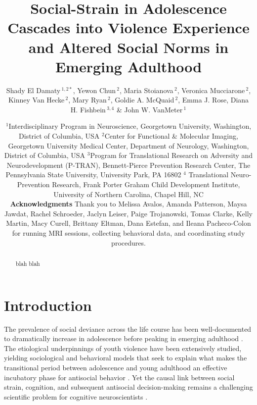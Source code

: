 \documentclass[utf8]{article}
\title{Social-Strain in Adolescence Cascades into Violence Experience and Altered Social Norms in Emerging Adulthood}
\author{
\parbox{\linewidth}{\centering
Shady El Damaty\,$^{1,2*}$, Yewon Chun\,$^{2}$, Maria Stoianova\,$^{2}$, Veronica Mucciarone\,$^{2}$,  Kinney Van Hecke\,$^{2}$, Mary Ryan\,$^{2}$, Goldie A. McQuaid\,$^{2}$, Emma J. Rose, Diana H. Fishbein\,$^{3,4}$ \& John W. VanMeter\,$^{1}$}
}
\date{\footnotesize{$^{1}$Interdisciplinary Program in Neuroscience, Georgetown University, Washington, District of Columbia, USA
$^{2}$Center for Functional \& Molecular Imaging, Georgetown University Medical Center, Department of Neurology, Washington, District of Columbia, USA
$^{3}$Program for Translational Research on Adversity and Neurodevelopment (P-TRAN), Bennett-Pierce Prevention Research Center, The Pennsylvania State University, University Park, PA 16802
$^{4}$ Translational Neuro-Prevention Research, Frank Porter Graham Child Development Institute, University of Northern Carolina, Chapel Hill, NC} \\  \vspace{5pt} \textbf{Acknowledgments}
Thank you to Melissa Avalos, Amanda Patterson, Maysa Jawdat, Rachel Schroeder, Jaclyn Leiser, Paige Trojanowski, Tomas Clarke, Kelly Martin, Macy Curell, Brittany Eltman, Dana Estefan, and Ileana Pacheco-Colon for running MRI sessions, collecting behavioral data, and coordinating study procedures. }
\begin{document}
\maketitle
\begin{abstract}
blah blah
\end{abstract}
\section*{Introduction}
The prevalence of social deviance across the life course has been well-documented to dramatically increase in adolescence before peaking in emerging adulthood \citep{loeber2011young,farrington1986age,maguire2004sourcebook,finkelhor2009children}. The etiological underpinnings of youth violence have been extensively studied, yielding sociological and behavioral models that seek to explain what makes the transitional period between adolescence and young adulthood an effective incubatory phase for antisocial behavior \citep{LunaWright2016,herz2018ojjdp,dahl2004adolescent}. Yet the causal link between social strain, cognition, and subsequent antisocial decision-making remains a challenging scientific problem for cognitive neuroscientists \citep{meisel2019mind,poldrack2018predicting}.
\end{document}

